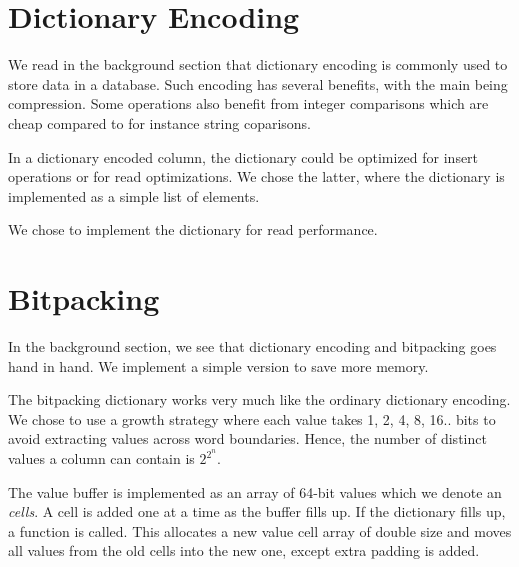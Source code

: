 \section{Dictionary Encoding}
\label{sec:Dictionary Encoding}
We read in the background section that dictionary encoding is commonly used to store data in a database. Such encoding has several benefits, with the main being compression. Some operations also benefit from integer comparisons which are cheap compared to for instance string coparisons.

In a dictionary encoded column, the dictionary could be optimized for insert operations or for read optimizations. We chose the latter, where the dictionary is implemented as a simple list of elements.


We chose to implement the dictionary for read performance.


\section{Bitpacking}
\label{sec:Bitpacking}
In the background section, we see that dictionary encoding and bitpacking goes hand in hand. We implement a simple version to save more memory. 

The bitpacking dictionary works very much like the ordinary dictionary encoding. We chose to use a growth strategy where each value takes 1, 2, 4, 8, 16.. bits to avoid extracting values across word boundaries. Hence, the number of distinct values a column can contain is $2^{2^n}$.

The value buffer is implemented as an array of 64-bit values which we denote an \textit{cells}. A cell is added one at a time as the buffer fills up. If the dictionary fills up, a  function is called. This allocates a new value cell array of double size and moves all values from the old cells into the new one, except extra padding is added.

